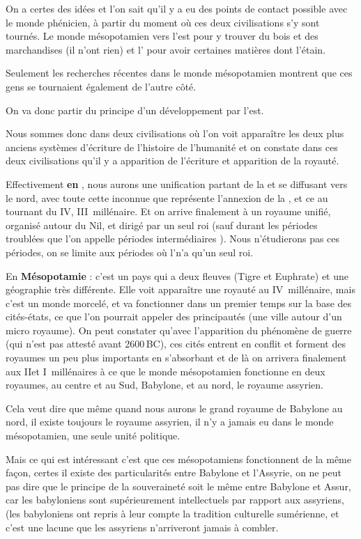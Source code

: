 \documentclass[a4paper,10pt]{article}
\begin{document}
On a certes des idées et l'on sait qu'il y a eu des points de 
contact possible avec le monde phénicien, à partir du moment où ces 
deux civilisations s'y sont tournés. Le monde mésopotamien vers l'est 
pour y trouver du bois et des marchandises (il n'ont rien) et l'\kmt 
pour avoir certaines matières dont l'étain.

Seulement les recherches récentes dans le monde mésopotamien montrent 
que ces gens se tournaient également de l'autre côté.

On va donc partir du principe d'un développement par l'est.

Nous sommes donc dans deux civilisations où l'on voit apparaître les 
deux plus anciens systèmes d'écriture de l'histoire de l'humanité et 
on constate dans ces deux civilisations qu'il y a apparition de 
l'écriture et apparition de la royauté.

Effectivement \textbf{en \kmt}, nous aurons une unification partant 
de la \HE et se diffusant vers le nord, avec toute cette inconnue que 
représente l'annexion de la \BE, et ce au tournant du IV\ieme, 
III\ieme~millénaire. Et on arrive finalement à un royaume unifié, 
organisé autour du Nil, et dirigé par un seul roi (sauf durant les 
périodes troublées que l'on appelle \og périodes intermédiaires \fg). 
Nous n'étudierons pas ces périodes, on se limite aux périodes où 
l'\kmt n'a qu'un seul roi.

En \textbf{Mésopotamie} : c'est un pays qui a deux fleuves (Tigre et 
Euphrate) et une géographie très différente. Elle voit apparaître une 
royauté au IV\ieme~millénaire, mais c'est un monde morcelé, et va 
fonctionner dans un premier temps sur la base des cités-états, ce que 
l'on pourrait appeler des principautés (une ville autour d'un micro 
royaume). On peut constater qu'avec l'apparition du phénomène de guerre 
(qui n'est pas attesté avant 2600\,BC), ces cités entrent en conflit et 
forment des royaumes un peu plus importants en s'absorbant et de là on 
arrivera finalement aux II\ieme et I\ier~millénaires à ce que le monde 
mésopotamien fonctionne en deux royaumes, au centre et au Sud, 
Babylone, et au nord, le royaume assyrien.

Cela veut dire que même quand nous aurons le grand royaume de Babylone 
au nord, il existe toujours le royaume assyrien, il n'y a jamais eu 
dans le monde mésopotamien, une seule unité politique.

Mais ce qui est intéressant c'est que ces mésopotamiens fonctionnent 
de la même façon, certes il existe des particularités entre Babylone 
et l'Assyrie, on ne peut pas dire que le principe de la souveraineté 
soit le même entre Babylone et Assur, car les babyloniens sont 
supérieurement intellectuels par rapport aux assyriens, (les 
babyloniens ont repris à leur compte la tradition culturelle 
sumérienne, et c'est une lacune que les assyriens n'arriveront jamais 
à combler.
\end{document}
